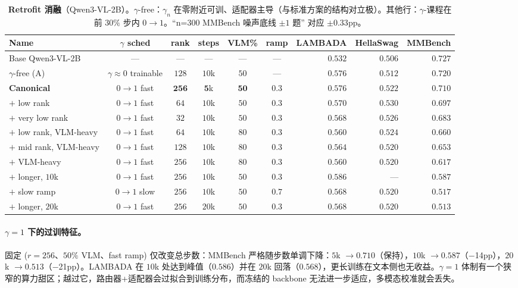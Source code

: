 \documentclass{article}
\begin{document}
\begin{table}[h]
\caption{\textbf{Retrofit 消融}（Qwen3-VL-2B）。$\gamma$-free：$\gamma_n$ 在零附近可训、适配器主导（与标准方案的结构对立极）。其他行：$\gamma$-课程在前 $30\%$ 步内 $0{\to}1$。``n=300 MMBench 噪声底线 $\pm 1$ 题'' 对应 $\pm 0.33$pp。}
\label{tab:retrofit_ablation}
\centering\small
\begin{tabular}{lcccccrrr}
\toprule
Name & $\gamma$ sched & rank & steps & VLM\% & ramp & LAMBADA & HellaSwag & MMBench \\
\midrule
Base Qwen3-VL-2B & --- & --- & --- & --- & --- & $0.532$ & $0.506$ & $0.727$ \\
$\gamma$-free (A) & $\gamma{\approx}0$ trainable & $128$ & $10$k & $50$ & --- & $0.576$ & $0.512$ & $0.720$ \\
\midrule
\textbf{Canonical} & $0{\to}1$ fast & $\mathbf{256}$ & $\mathbf{5}$k & $\mathbf{50}$ & $\mathbf{0.3}$ & $\mathbf{0.576}$ & $\mathbf{0.522}$ & $\mathbf{0.710}$ \\
$+$ low rank      & $0{\to}1$ fast & $64$  & $10$k & $50$ & $0.3$ & $0.570$ & $0.530$ & $0.697$ \\
$+$ very low rank & $0{\to}1$ fast & $32$  & $10$k & $50$ & $0.3$ & $0.568$ & $0.526$ & $0.683$ \\
$+$ low rank, VLM-heavy & $0{\to}1$ fast & $64$  & $10$k & $80$ & $0.3$ & $0.560$ & $0.524$ & $0.660$ \\
$+$ mid rank, VLM-heavy & $0{\to}1$ fast & $128$ & $10$k & $80$ & $0.3$ & $0.564$ & $0.520$ & $0.653$ \\
$+$ VLM-heavy     & $0{\to}1$ fast & $256$ & $10$k & $80$ & $0.3$ & $0.560$ & $0.520$ & $0.617$ \\
$+$ longer, $10$k & $0{\to}1$ fast & $256$ & $10$k & $50$ & $0.3$ & $0.586$ & ---     & $0.587$ \\
$+$ slow ramp     & $0{\to}1$ slow & $256$ & $10$k & $50$ & $0.7$ & $0.568$ & $0.520$ & $0.517$ \\
$+$ longer, $20$k & $0{\to}1$ fast & $256$ & $20$k & $50$ & $0.3$ & $0.568$ & $0.520$ & $0.513$ \\
\bottomrule
\end{tabular}
\end{table}

\paragraph{$\gamma{=}1$ 下的过训特征。} 固定 ($r{=}256$、$50\%$ VLM、fast ramp) 仅改变总步数：MMBench 严格随步数单调下降：$5$k $\to 0.710$（保持），$10$k $\to 0.587$（$-$14pp），$20$k $\to 0.513$（$-$21pp）。LAMBADA 在 $10$k 处达到峰值（$0.586$）并在 $20$k 回落（$0.568$），更长训练在文本侧也无收益。$\gamma{=}1$ 体制有一个狭窄的算力甜区；越过它，路由器+适配器会过拟合到训练分布，而冻结的 backbone 无法进一步适应，多模态校准就会丢失。
\end{document}
